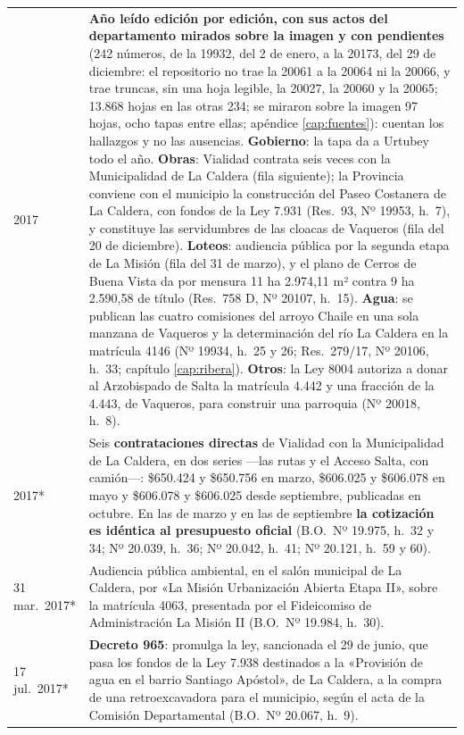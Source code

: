 \begin{longtable}{@{}p{2.7cm}p{10.3cm}@{}}
2017 & \textbf{Año leído edición por edición, con sus actos del departamento mirados sobre la imagen y con pendientes} (242 números, de la 19932, del 2 de enero, a la 20173, del 29 de diciembre: el repositorio no trae la 20061 a la 20064 ni la 20066, y trae truncas, sin una hoja legible, la 20027, la 20060 y la 20065; 13.868 hojas en las otras 234; se miraron sobre la imagen 97 hojas, ocho tapas entre ellas; apéndice \ref{cap:fuentes}): cuentan los hallazgos y no las ausencias. \textbf{Gobierno}: la tapa da a Urtubey todo el año. \textbf{Obras}: Vialidad contrata seis veces con la Municipalidad de La Caldera (fila siguiente); la Provincia conviene con el municipio la construcción del Paseo Costanera de La Caldera, con fondos de la Ley 7.931 (Res.\ 93, Nº 19953, h.\ 7), y constituye las servidumbres de las cloacas de Vaqueros (fila del 20 de diciembre). \textbf{Loteos}: audiencia pública por la segunda etapa de La Misión (fila del 31 de marzo), y el plano de Cerros de Buena Vista da por mensura 11 ha 2.974,11 m² contra 9 ha 2.590,58 de título (Res.\ 758 D, Nº 20107, h.\ 15). \textbf{Agua}: se publican las cuatro comisiones del arroyo Chaile en una sola manzana de Vaqueros y la determinación del río La Caldera en la matrícula 4146 (Nº 19934, h.\ 25 y 26; Res.\ 279/17, Nº 20106, h.\ 33; capítulo \ref{cap:ribera}). \textbf{Otros}: la Ley 8004 autoriza a donar al Arzobispado de Salta la matrícula 4.442 y una fracción de la 4.443, de Vaqueros, para construir una parroquia (Nº 20018, h.\ 8). \\
2017* & Seis \textbf{contrataciones directas} de Vialidad con la Municipalidad de La Caldera, en dos series ---las rutas y el Acceso Salta, con camión---: \$650.424 y \$650.756 en marzo, \$606.025 y \$606.078 en mayo y \$606.078 y \$606.025 desde septiembre, publicadas en octubre. En las de marzo y en las de septiembre \textbf{la cotización es idéntica al presupuesto oficial} (B.O.\ Nº 19.975, h.\ 32 y 34; Nº 20.039, h.\ 36; Nº 20.042, h.\ 41; Nº 20.121, h.\ 59 y 60). \\
31 mar.\ 2017* & Audiencia pública ambiental, en el salón municipal de La Caldera, por «La Misión Urbanización Abierta Etapa II», sobre la matrícula 4063, presentada por el Fideicomiso de Administración La Misión II (B.O.\ Nº 19.984, h.\ 30). \\
17 jul.\ 2017* & \textbf{Decreto 965}: promulga la ley, sancionada el 29 de junio, que pasa los fondos de la Ley 7.938 destinados a la «Provisión de agua en el barrio Santiago Apóstol», de La Caldera, a la compra de una retroexcavadora para el municipio, según el acta de la Comisión Departamental (B.O.\ Nº 20.067, h.\ 9). \\

\end{longtable}
